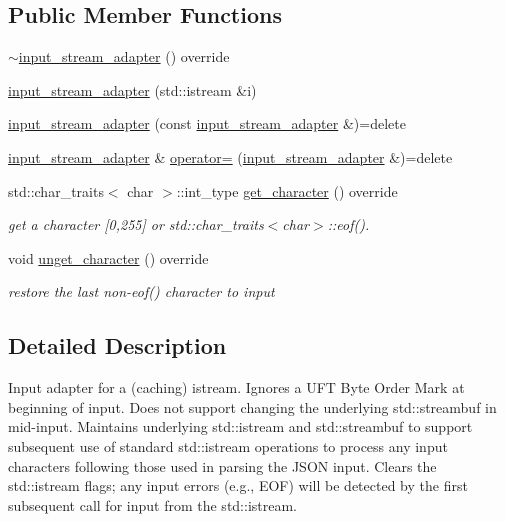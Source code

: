 \subsection*{Public Member Functions}
\begin{DoxyCompactItemize}
\item 
\hyperlink{classnlohmann_1_1detail_1_1input__stream__adapter_a2d71eb469267abd864f765481d1e823f}{$\sim$input\+\_\+stream\+\_\+adapter} () override
\item 
\hyperlink{classnlohmann_1_1detail_1_1input__stream__adapter_af487152e4606d013eb4ec6a90eaf82ea}{input\+\_\+stream\+\_\+adapter} (std\+::istream \&i)
\item 
\hyperlink{classnlohmann_1_1detail_1_1input__stream__adapter_a5190fe4d0c5ff2e3b348b28ee3bb2218}{input\+\_\+stream\+\_\+adapter} (const \hyperlink{classnlohmann_1_1detail_1_1input__stream__adapter}{input\+\_\+stream\+\_\+adapter} \&)=delete
\item 
\hyperlink{classnlohmann_1_1detail_1_1input__stream__adapter}{input\+\_\+stream\+\_\+adapter} \& \hyperlink{classnlohmann_1_1detail_1_1input__stream__adapter_aeac5048221929b8f7558d1698dd0fb3a}{operator=} (\hyperlink{classnlohmann_1_1detail_1_1input__stream__adapter}{input\+\_\+stream\+\_\+adapter} \&)=delete
\item 
std\+::char\+\_\+traits$<$ char $>$\+::int\+\_\+type \hyperlink{classnlohmann_1_1detail_1_1input__stream__adapter_ae0760af923583de6354725e901d1869d}{get\+\_\+character} () override
\begin{DoxyCompactList}\small\item\em get a character \mbox{[}0,255\mbox{]} or std\+::char\+\_\+traits$<$char$>$\+::eof(). \end{DoxyCompactList}\item 
void \hyperlink{classnlohmann_1_1detail_1_1input__stream__adapter_ab6a65d3816ce4027ef4d2013a13ee697}{unget\+\_\+character} () override
\begin{DoxyCompactList}\small\item\em restore the last non-\/eof() character to input \end{DoxyCompactList}\end{DoxyCompactItemize}


\subsection{Detailed Description}
Input adapter for a (caching) istream. Ignores a U\+FT Byte Order Mark at beginning of input. Does not support changing the underlying std\+::streambuf in mid-\/input. Maintains underlying std\+::istream and std\+::streambuf to support subsequent use of standard std\+::istream operations to process any input characters following those used in parsing the J\+S\+ON input. Clears the std\+::istream flags; any input errors (e.\+g., E\+OF) will be detected by the first subsequent call for input from the std\+::istream. 

